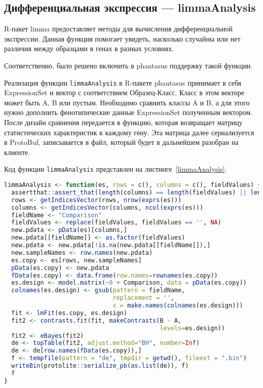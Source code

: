 \documentclass[annotation,specification]{itmo-student-thesis}
\begin{document}
\subsection{Дифференциальная экспрессия --- limmaAnalysis}
R-пакет limma \cite{limma} предоставляет методы для вычисления дифференциальной экспрессии. Данная функция помогает увидеть, насколько случайны или нет различия между образцами в генах в разных условиях.

Соответственно, было решено включить в phantasus поддержку такой функции.

Реализация функции \texttt{limmaAnalysis} в R-пакете phantasus принимает в себя ExpressionSet и вектор с соответствием Образец-Класс. Класс в этом векторе может быть A, B или пустым. Необходимо сравнить классы A и B, а для этого нужно дополнить фенотипические данные ExpressionSet полученным вектором.
После дизайн сравнения передается в функцию, которая возвращает матрицу статистических характеристик к каждому гену.
Эта матрица далее сериализуется в ProtoBuf, записывается в файл, который будет в дальнейшем разобран на клиенте.

Код функции \texttt{limmaAnalysis} представлен на листинге~\ref{limmaAnalysis}.

\begin{lstlisting}[float=!h,caption={Реализация дифференциальной экспрессии в R-пакете phantasus},label={limmaAnalysis},language=R]
limmaAnalysis <- function(es, rows = c(), columns = c(), fieldValues) {
  assertthat::assert_that(length(columns) == length(fieldValues) || length(columns) == 0)
  rows <- getIndicesVector(rows, nrow(exprs(es)))
  columns <- getIndicesVector(columns, ncol(exprs(es)))
  fieldName <- "Comparison"
  fieldValues <- replace(fieldValues, fieldValues == '', NA)
  new.pdata <- pData(es)[columns,]
  new.pdata[[fieldName]] <- as.factor(fieldValues)
  new.pdata <- new.pdata[!is.na(new.pdata[[fieldName]]),]
  new.sampleNames <- row.names(new.pdata)
  es.copy <- es[rows, new.sampleNames]
  pData(es.copy) <- new.pdata
  fData(es.copy) <- data.frame(row.names=rownames(es.copy))
  es.design <- model.matrix(~0 + Comparison, data = pData(es.copy))
  colnames(es.design) <- gsub(pattern = fieldName,
                              replacement = '',
                              x = make.names(colnames(es.design)))
  fit <- lmFit(es.copy, es.design)
  fit2 <- contrasts.fit(fit, makeContrasts(B - A,
                                           levels=es.design))
  fit2 <- eBayes(fit2)
  de <- topTable(fit2, adjust.method="BH", number=Inf)
  de <- de[row.names(fData(es.copy)),]
  f <- tempfile(pattern = "de", tmpdir = getwd(), fileext = ".bin")
  writeBin(protolite::serialize_pb(as.list(de)), f)
  f
}
\end{lstlisting}
\end{document}
